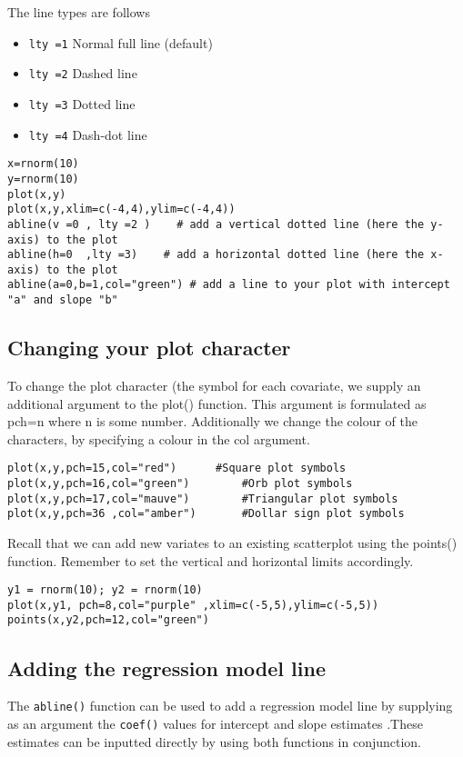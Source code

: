 \documentclass[a4paper,12pt]{article}
\begin{document}
\begin{itemize}
\begin{itemize}
The line types are follows
\begin{itemize}
\item	\texttt{lty =1}   Normal full line (default)
\item	\texttt{lty =2}   Dashed line
\item	\texttt{lty =3}   Dotted line
\item	\texttt{lty =4}   Dash-dot line
\end{itemize}
\footnotesize \begin{verbatim}
x=rnorm(10)
y=rnorm(10)
plot(x,y)
plot(x,y,xlim=c(-4,4),ylim=c(-4,4))
abline(v =0 , lty =2 )    # add a vertical dotted line (here the y-axis) to the plot
abline(h=0  ,lty =3)    # add a horizontal dotted line (here the x-axis) to the plot
abline(a=0,b=1,col="green") # add a line to your plot with intercept "a" and slope "b"
 \end{verbatim}\normalsize

\subsection{Changing your plot character}

To change the plot character (the symbol for each covariate, we supply an additional argument to the plot() function.  This argument is formulated as pch=n where n is some number.
Additionally we change the colour of the characters, by specifying a colour in the col argument.
\footnotesize \begin{verbatim}
plot(x,y,pch=15,col="red")		#Square plot symbols
plot(x,y,pch=16,col="green")		#Orb plot symbols
plot(x,y,pch=17,col="mauve")		#Triangular plot symbols
plot(x,y,pch=36	,col="amber")		#Dollar sign plot symbols
\end{verbatim}\normalsize
Recall that we can add new variates to an existing scatterplot using the points() function. Remember to set the vertical and horizontal limits accordingly.
\footnotesize \begin{verbatim}
y1 = rnorm(10); y2 = rnorm(10)
plot(x,y1, pch=8,col="purple" ,xlim=c(-5,5),ylim=c(-5,5))
points(x,y2,pch=12,col="green")
\end{verbatim}\normalsize
\subsection{Adding the regression model line}

The \texttt{abline()} function can be used to add a regression model line  by supplying as an argument the \texttt{coef()} values for intercept and slope estimates .These estimates can be inputted directly by using both functions in conjunction.


\end{itemize}
\end{itemize}
\end{document}
